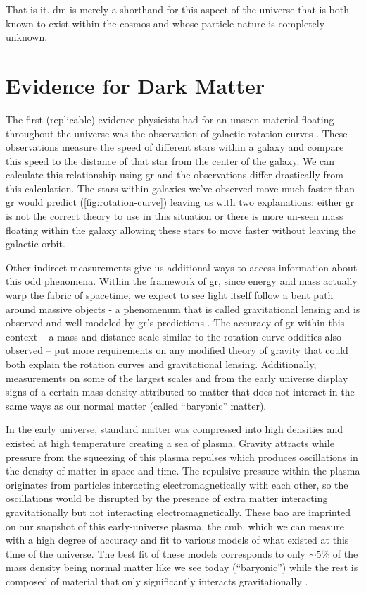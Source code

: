 That is it. \acf{dm} is merely a shorthand for this aspect of the universe that is both known to
exist within the cosmos and whose particle nature is completely unknown.

\section{Evidence for Dark Matter}
\label{sec:dm:evidence}

The first (replicable) evidence physicists had for an unseen material floating throughout the
universe was the observation of galactic rotation curves
\cite{rubin-rotationcurve-1980,rotationcurve-2000}. These observations measure the speed of
different stars within a galaxy and compare this speed to the distance of that star from the center
of the galaxy. We can calculate this relationship using \ac{gr}
\cite{rotationcurve-predictions-2007} and the observations differ drastically from this
calculation. The stars within galaxies we've observed move much faster than \ac{gr} would predict
(\cref{fig:rotation-curve}) leaving us with two explanations: either \ac{gr} is not the correct
theory to use in this situation or there is more un-seen mass floating within the galaxy allowing
these stars to move faster without leaving the galactic orbit.

Other indirect measurements give us additional ways to access information about this odd phenomena.
Within the framework of \ac{gr}, since energy and mass actually warp the fabric of spacetime, we
expect to see light itself follow a bent path around massive objects - a phenomenum that is called
gravitational lensing and is observed and well modeled by \ac{gr}'s predictions
\cite{gravlensing-2004}. The accuracy of \ac{gr} within this context -- a mass and distance scale
similar to the rotation curve oddities also observed -- put more requirements on any modified
theory of gravity that could both explain the rotation curves and gravitational lensing.
Additionally, measurements on some of the largest scales and from the early universe display signs
of a certain mass density attributed to matter that does not interact in the same ways as our normal
matter (called ``baryonic'' matter).

In the early universe, standard matter was compressed into high densities and existed at high
temperature creating a sea of plasma. Gravity attracts while pressure from the squeezing of this
plasma repulses which produces oscillations in the density of matter in space and time. The
repulsive pressure within the plasma originates from particles interacting electromagnetically with
each other, so the oscillations would be disrupted by the presence of extra matter interacting
gravitationally but not interacting electromagnetically. These \ac{bao} are imprinted on our
snapshot of this early-universe plasma, the \ac{cmb}, which we can measure with a high degree of
accuracy and fit to various models of what existed at this time of the universe. The best fit of
these models corresponds to only $\sim 5\%$ of the mass density being normal matter like we see
today (``baryonic'') while the rest is composed of material that only significantly interacts
gravitationally \cite{planck-cmb-2015}.

